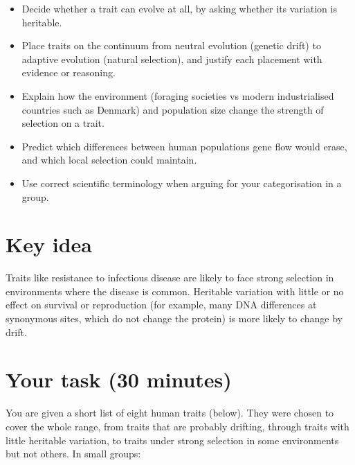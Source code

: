 \documentclass[
  a4paper]{book}
\providecommand{\tightlist}{%
  \setlength{\itemsep}{0pt}\setlength{\parskip}{0pt}}
\begin{document}
\begin{itemize}
\tightlist
\item
  Decide whether a trait can evolve at all, by asking whether its variation is heritable.
\item
  Place traits on the continuum from neutral evolution (genetic drift) to adaptive evolution (natural selection), and justify each placement with evidence or reasoning.
\item
  Explain how the environment (foraging societies vs modern industrialised countries such as Denmark) and population size change the strength of selection on a trait.
\item
  Predict which differences between human populations gene flow would erase, and which local selection could maintain.
\item
  Use correct scientific terminology when arguing for your categorisation in a group.
\end{itemize}

\section{Key idea}\label{key-idea}

Traits like resistance to infectious disease are likely to face strong selection in environments where the disease is common. Heritable variation with little or no effect on survival or reproduction (for example, many DNA differences at synonymous sites, which do not change the protein) is more likely to change by drift.

\section{Your task (30 minutes)}\label{your-task-30-minutes}

You are given a short list of eight human traits (below). They were chosen to cover the whole range, from traits that are probably drifting, through traits with little heritable variation, to traits under strong selection in some environments but not others. In small groups:
\end{document}
